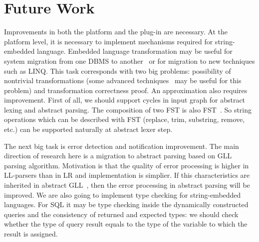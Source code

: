 \documentclass{acm_proc_article-sp}
\begin{document}
\section{Future Work}

Improvements in both the platform and the plug-in are necessary. At the platform level, it is necessary to implement mechanisms required for string-embedded language. Embedded language transformation may be useful for system migration from one DBMS to another~\cite{GrigorevDSQL} or for migration to new techniques such as LINQ. This task corresponds with two big problems: possibility of nontrivial transformations (some advanced techniques~\cite{Ter1,Bou_Ko} may be useful for this problem) and transformation correctness proof. An approximation also requires improvement. First of all, we should support cycles in input graph for abstract lexing and abstract parsing. The composition of two FST is also FST~\cite{FST}. So string operations which can be described with FST (replace, trim, substring, remove, etc.) can be supported naturally at abstract lexer step. 

The next big task is error detection and notification improvement. The main direction of research here is a migration to abstract parsing based on GLL parsing algorithm. Motivation is that the quality of error processing is higher in LL-parsers than in LR and implementation is simplier. If this characteristics are inherited in abstract GLL~\cite{GLL}, then the error processing in abstract parsing will be improved. We are also going to implement type checking for string-embedded languages. For SQL it may be type checking inside the dynamically constructed queries and the consistency of returned and expected types: we should check whether the type of query result equals to the type of the variable to which the result is assigned.
\end{document}
